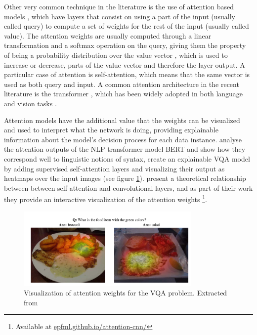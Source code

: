 Other very common technique in the literature is the use of attention based models \cite{bahdanau_attention},
which have layers that consist on using a part of the input (usually called query) to compute a set of weights
for the rest of the input (usually called value). The attention weights are usually computed through
a linear transformation and a softmax operation on the query, giving them the property of being a probability
distribution over the value vector \cite{cordonnier_relationship}, which is used to increase or decrease,
parts of the value vector and therefore the layer output. A particular case of attention is
self-attention, which means that the same vector is used as both query and input. A common attention architecture
in the recent literature is the transformer \cite{vaswani_attention}, which has been widely adopted in both
language and vision tasks \cite{devlin_bert, radford_gpt, bello_attention, li_visualbert, carion_object}.

Attention models have the additional value that the weights can be visualized and used to interpret what the network is doing, providing
explainable information about the model's decision process for each data instance.
 analyse the attention outputs of the NLP transformer model BERT and show how they correspond
well to linguistic notions of syntax,  create an explainable VQA model by adding
supervised self-attention layers and visualizing their output as heatmaps over the input images
(see figure \ref{fig:vqa}).  present a theoretical  relationship between
between self attention and convolutional layers, and as part of their work they provide an interactive visualization
of the attention weights \footnote{Available at \url{epfml.github.io/attention-cnn/}}.

\begin{figure}[ht]
	\begin{center}
	\includegraphics[width=0.8\textwidth]{./figures/soto.png}
	\caption[Attention on VQA]{Visualization of attention weights for the VQA problem. Extracted from  }
	\label{fig:vqa}
	\end{center}
\end{figure}

